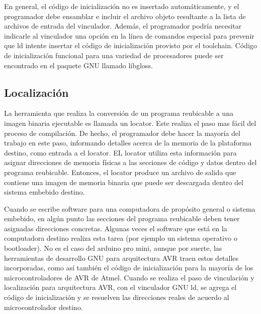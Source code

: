 \documentclass[12pt]{article}
\begin{document}
En general, el código de inicialización no es insertado automáticamente, y el
programador debe ensamblar e incluir el archivo objeto resultante a la 
lista de archivos de entrada del vinculador. Además, el programador
podría necesitar indicarle al vinculador una opción en la línea de comandos especial
para prevenir que ld intente insertar el código de inicialización provisto
por el toolchain.
Código de inicialización funcional para una variedad de procesadores puede
ser encontrado en el paquete GNU llamado libgloss.



\subsection *{Localización}

La herramienta que realiza la conversión de un programa reubicable a
una imagen binaria ejecutable es llamada un locator.
Este realiza el paso mas fácil del proceso de compilación. De hecho, 
el programador debe hacer la mayoría del trabajo en este paso, informando
detalles acerca de la memoria de la plataforma destino, como entrada
a el locator. EL locator utiliza esta información para asignar direcciones
de memoria físicas a las secciones de código y datos dentro del programa
reubicable. Entonces, el locator produce un archivo de salida que contiene
una imagen de memoria binaria que puede ser descargada dentro del sistema
embebido destino.

Cuando se escribe software para una computadora de propósito general o
sistema embebido, en algún punto las secciones del programa reubicable
deben tener asignadas direcciones concretas. Algunas veces el software
que está en la computadora destino realiza esta tarea (por ejemplo un sistema
operativo o bootloader). No es el caso del arduino pro mini, aunque por suerte,
las herramientas de desarrollo GNU para arquitectura AVR traen estos detalles 
incorporadas, como así también el código de inicialización para la mayoría
de los microcontroladores de AVR de Atmel.
Cuando se realiza el paso de vinculación y localización para arquitectura AVR,
con el vinculador GNU ld, se agrega el código de inicialización y se 
resuelven las direcciones reales de acuerdo al microcontrolador destino.
\end{document}
